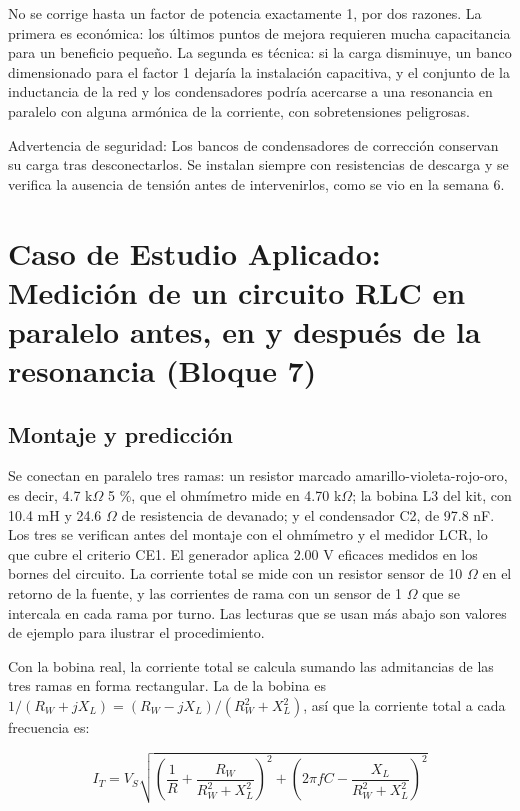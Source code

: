 \documentclass[11pt,letterpaper]{article}
\begin{document}
No se corrige hasta un factor de potencia exactamente 1, por dos razones. La primera es económica: los últimos puntos de mejora requieren mucha capacitancia para un beneficio pequeño. La segunda es técnica: si la carga disminuye, un banco dimensionado para el factor 1 dejaría la instalación capacitiva, y el conjunto de la inductancia de la red y los condensadores podría acercarse a una resonancia en paralelo con alguna armónica de la corriente, con sobretensiones peligrosas.

\begin{nota}{Advertencia de seguridad:}
Los bancos de condensadores de corrección conservan su carga tras desconectarlos. Se instalan siempre con resistencias de descarga y se verifica la ausencia de tensión antes de intervenirlos, como se vio en la semana 6.
\end{nota}

\section{Caso de Estudio Aplicado: Medición de un circuito RLC en paralelo antes, en y después de la resonancia (Bloque 7)}

\subsection{Montaje y predicción}

Se conectan en paralelo tres ramas: un resistor marcado amarillo-violeta-rojo-oro, es decir, 4.7 k\ensuremath{\Omega} \textpm{}5 \%, que el ohmímetro mide en 4.70 k\ensuremath{\Omega}; la bobina L3 del kit, con 10.4 mH y 24.6 \ensuremath{\Omega} de resistencia de devanado; y el condensador C2, de 97.8 nF. Los tres se verifican antes del montaje con el ohmímetro y el medidor LCR, lo que cubre el criterio CE1. El generador aplica 2.00 V eficaces medidos en los bornes del circuito. La corriente total se mide con un resistor sensor de 10 \ensuremath{\Omega} en el retorno de la fuente, y las corrientes de rama con un sensor de 1 \ensuremath{\Omega} que se intercala en cada rama por turno. Las lecturas que se usan más abajo son valores de ejemplo para ilustrar el procedimiento.

Con la bobina real, la corriente total se calcula sumando las admitancias de las tres ramas en forma rectangular. La de la bobina es $1/(R_W + jX_L) = (R_W - jX_L)/(R_W^2 + X_L^2)$, así que la corriente total a cada frecuencia es:

\begin{equation}
  I_T = V_S\sqrt{\left(\frac{1}{R} + \frac{R_W}{R_W^{2} + X_L^{2}}\right)^{2} + \left(2\pi f C - \frac{X_L}{R_W^{2} + X_L^{2}}\right)^{2}}
\end{equation}
\end{document}
